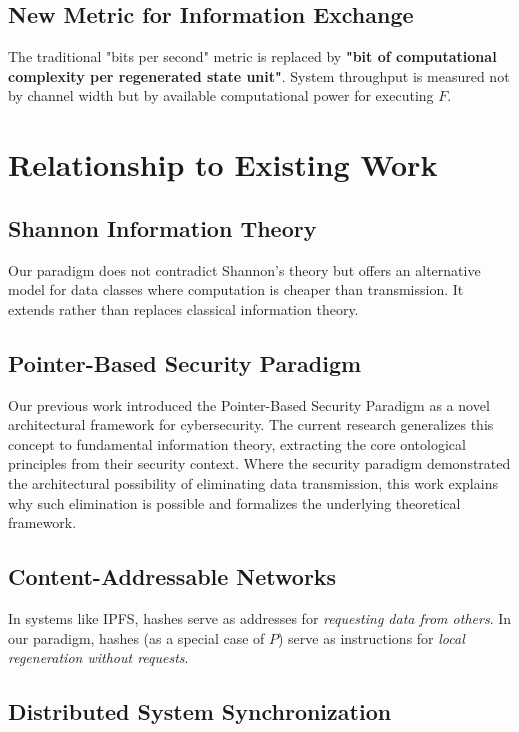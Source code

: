\documentclass[11pt,a4paper]{article}
\begin{document}
\subsection{New Metric for Information Exchange}

The traditional "bits per second" metric is replaced by \textbf{"bit of computational complexity per regenerated state unit"}. System throughput is measured not by channel width but by available computational power for executing $F$.

\section{Relationship to Existing Work}

\subsection{Shannon Information Theory}

Our paradigm does not contradict Shannon's theory but offers an alternative model for data classes where computation is cheaper than transmission. It extends rather than replaces classical information theory.

\subsection{Pointer-Based Security Paradigm}

Our previous work \cite{suvorov2025pointer} introduced the Pointer-Based Security
Paradigm as a novel architectural framework for cybersecurity. The current research
generalizes this concept to fundamental information theory, extracting the core
ontological principles from their security context. Where the security paradigm
demonstrated the architectural possibility of eliminating data transmission,
this work explains why such elimination is possible and formalizes the underlying
theoretical framework.

\subsection{Content-Addressable Networks}

In systems like IPFS, hashes serve as addresses for \emph{requesting data from others}. In our paradigm, hashes (as a special case of $P$) serve as instructions for \emph{local regeneration without requests}.

\subsection{Distributed System Synchronization}
\end{document}
